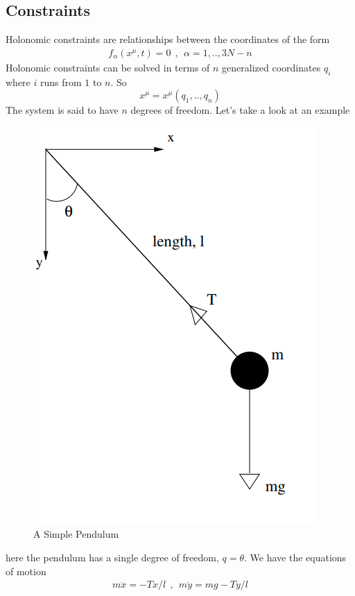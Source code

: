 \subsection{Constraints}
Holonomic constraints are relationships between the coordinates of the form
    \begin{align}
        f_{\alpha}(x^{\mu},t) = 0 \ \ , \ \ \alpha = 1,..,3N-n
    \end{align}
Holonomic constraints can be solved in terms of $n$ generalized coordinates $q_{i}$ where $i$ runs from $1$ to $n$. So 
\begin{equation}
    x^{\mu} = x^{\mu}(q_{1},..,q_{n})
\end{equation}
The system is said to have $n$ degrees of freedom. Let's take a look at an example
\begin{figure}[H]
    \centering
    \includegraphics[scale=0.5]{Figures/pendulum.png}
    \caption{A Simple Pendulum}
    \label{fig:my_label}
\end{figure}
here the pendulum has a single degree of freedom, $q = \theta$. We have the equations of motion
    \begin{align}
        m\ddot{x} = -Tx/l \ \ , \ \ m \ddot{y} = mg - Ty/l
    \end{align}
